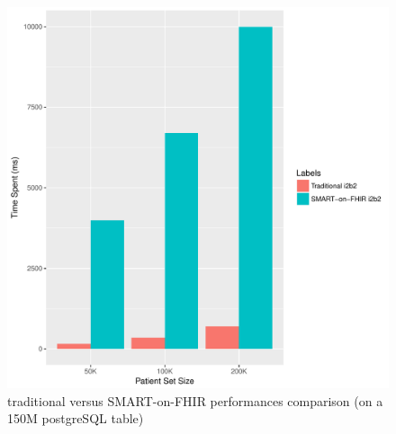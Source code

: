 \documentclass{amia}
\begin{document}
\begin{figure}[h]
\centering
\includegraphics[scale=.7]{graph2.pdf}
	\caption{traditional versus SMART-on-FHIR performances comparison (on a 150M postgreSQL table)}
\label{fig1}
\end{figure}
\end{document}
